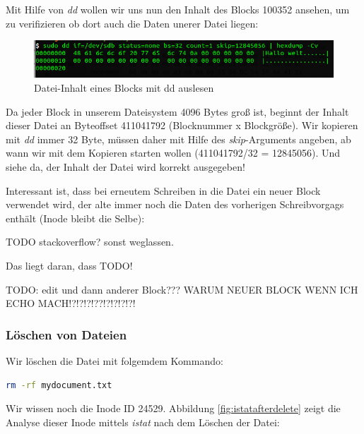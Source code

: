 Mit Hilfe von \textit{dd} wollen wir uns nun den Inhalt des Blocks 100352 ansehen, um zu verifizieren ob dort auch die Daten unerer Datei liegen:

\begin{figure}[H]
	\centering
	\includegraphics[width=12cm,keepaspectratio=true]{pictures/getfilecontent.png}
	\caption{
		Datei-Inhalt eines Blocks mit dd auslesen
	}
	\label{fig:getfilecontent}
\end{figure}

Da jeder Block in unserem Dateisystem 4096 Bytes groß ist, beginnt der Inhalt dieser Datei an Byteoffset 411041792 (Blocknummer x Blockgröße). Wir kopieren mit \textit{dd} immer 32 Byte, müssen daher mit Hilfe des \textit{skip}-Arguments angeben, ab wann wir mit dem Kopieren starten wollen (411041792/32 = 12845056). Und siehe da, der Inhalt der Datei wird korrekt ausgegeben!

Interessant ist, dass bei erneutem Schreiben in die Datei ein neuer Block verwendet wird, der alte immer noch die Daten des vorherigen Schreibvorgags enthält (Inode bleibt die Selbe):

TODO stackoverflow? sonst weglassen.

Das liegt daran, dass TODO!


TODO: edit und dann anderer Block??? WARUM NEUER BLOCK WENN ICH ECHO MACH!?!?!?!??!?!?!?!?!


\subsubsection{Löschen von Dateien}

Wir löschen die Datei mit folgemdem Kommando:

\begin{lstlisting}[language=bash]
rm -rf mydocument.txt
\end{lstlisting} 

Wir wissen noch die Inode ID 24529. Abbildung \ref{fig:istatafterdelete} zeigt die Analyse dieser Inode mittels \textit{istat} nach dem Löschen der Datei:

